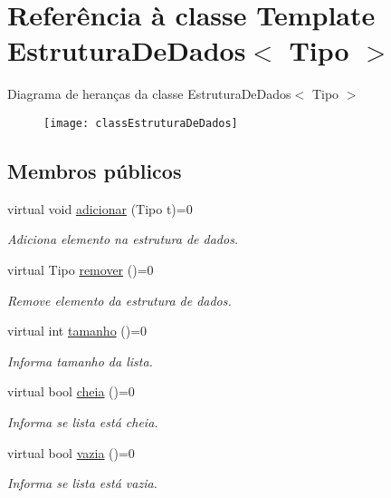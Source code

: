 \hypertarget{classEstruturaDeDados}{\section{Referência à classe Template Estrutura\-De\-Dados$<$ Tipo $>$}
\label{classEstruturaDeDados}
}
Diagrama de heranças da classe Estrutura\-De\-Dados$<$ Tipo $>$\begin{figure}[H]
\begin{center}
\leavevmode
\texttt{[image: classEstruturaDeDados]}
\end{center}
\end{figure}
\subsection*{Membros públicos}
\begin{DoxyCompactItemize}
\item 
virtual void \hyperlink{classEstruturaDeDados_a66bd359407b52b76b5be611ef25cf847}{adicionar} (Tipo t)=0
\begin{DoxyCompactList}\small\item\em Adiciona elemento na estrutura de dados. \end{DoxyCompactList}\item 
virtual Tipo \hyperlink{classEstruturaDeDados_a01ddc5aec2e4a425e4021055c15e7f02}{remover} ()=0
\begin{DoxyCompactList}\small\item\em Remove elemento da estrutura de dados. \end{DoxyCompactList}\item 
virtual int \hyperlink{classEstruturaDeDados_aedcdd78aed7517cfad5ddbe374d7ce88}{tamanho} ()=0
\begin{DoxyCompactList}\small\item\em Informa tamanho da lista. \end{DoxyCompactList}\item 
virtual bool \hyperlink{classEstruturaDeDados_a5d7866e13c2e6129e42979093569348c}{cheia} ()=0
\begin{DoxyCompactList}\small\item\em Informa se lista está cheia. \end{DoxyCompactList}\item 
virtual bool \hyperlink{classEstruturaDeDados_aa45fc3c6284cba7c27b9cd128e71a079}{vazia} ()=0
\begin{DoxyCompactList}\small\item\em Informa se lista está vazia. \end{DoxyCompactList}\end{DoxyCompactItemize}


